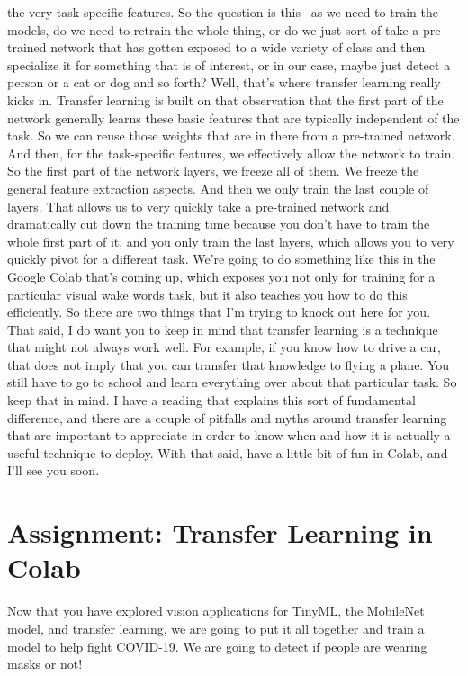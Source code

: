 the very task-specific features.
So the question is this--
as we need to train the models, do we need to retrain the whole thing,
or do we just sort of take a pre-trained network that
has gotten exposed to a wide variety of class
and then specialize it for something that is of interest, or in our case,
maybe just detect a person or a cat or dog and so forth?
Well, that's where transfer learning really kicks in.
Transfer learning is built on that observation
that the first part of the network generally
learns these basic features that are typically independent of the task.
So we can reuse those weights that are in there from a pre-trained network.
And then, for the task-specific features,
we effectively allow the network to train.
So the first part of the network layers, we freeze all of them.
We freeze the general feature extraction aspects.
And then we only train the last couple of layers.
That allows us to very quickly take a pre-trained network
and dramatically cut down the training time because you
don't have to train the whole first part of it,
and you only train the last layers, which
allows you to very quickly pivot for a different task.
We're going to do something like this in the Google Colab that's coming up,
which exposes you not only for training for a particular visual wake words
task, but it also teaches you how to do this efficiently.
So there are two things that I'm trying to knock out here for you.
That said, I do want you to keep in mind that transfer learning is a technique
that might not always work well.
For example, if you know how to drive a car, that does not
imply that you can transfer that knowledge to flying a plane.
You still have to go to school and learn everything over
about that particular task.
So keep that in mind.
I have a reading that explains this sort of fundamental difference,
and there are a couple of pitfalls and myths around transfer learning
that are important to appreciate in order
to know when and how it is actually a useful technique to deploy.
With that said, have a little bit of fun in Colab, and I'll see you soon.

\section{Assignment: Transfer Learning in Colab}

Now that you have explored vision applications for TinyML, the MobileNet model, and transfer learning, we are going to put it all together and train a model to help fight COVID-19. We are going to detect if people are wearing masks or not! 

